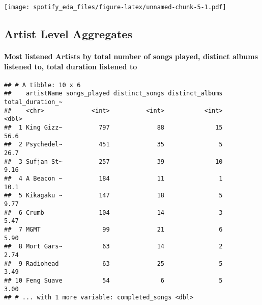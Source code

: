 \documentclass[]{article}
\newenvironment{Shaded}{\begin{snugshade}}{\end{snugshade}}
\newcommand{\DataTypeTok}[1]{\textcolor[rgb]{0.13,0.29,0.53}{#1}}
\newcommand{\DecValTok}[1]{\textcolor[rgb]{0.00,0.00,0.81}{#1}}
\newcommand{\KeywordTok}[1]{\textcolor[rgb]{0.13,0.29,0.53}{\textbf{#1}}}
\newcommand{\NormalTok}[1]{#1}
\newcommand{\OperatorTok}[1]{\textcolor[rgb]{0.81,0.36,0.00}{\textbf{#1}}}
\newcommand{\StringTok}[1]{\textcolor[rgb]{0.31,0.60,0.02}{#1}}
\let\oldparagraph\paragraph
\renewcommand{\paragraph}[1]{\oldparagraph{#1}\mbox{}}
\begin{document}
\texttt{[image: spotify\_eda\_files/figure-latex/unnamed-chunk-5-1.pdf]}

\hypertarget{artist-level-aggregates}{%
\subsection{Artist Level Aggregates}\label{artist-level-aggregates}}

\hypertarget{most-listened-artists-by-total-number-of-songs-played-distinct-albums-listened-to-total-duration-listened-to}{%
\paragraph{Most listened Artists by total number of songs played,
distinct albums listened to, total duration listened
to}\label{most-listened-artists-by-total-number-of-songs-played-distinct-albums-listened-to-total-duration-listened-to}}

\begin{Shaded}
\end{Shaded}

\begin{verbatim}
## # A tibble: 10 x 6
##    artistName songs_played distinct_songs distinct_albums total_duration_~
##    <chr>             <int>          <int>           <int>            <dbl>
##  1 King Gizz~          797             88              15            56.6 
##  2 Psychedel~          451             35               5            26.7 
##  3 Sufjan St~          257             39              10             9.16
##  4 A Beacon ~          184             11               1            10.1 
##  5 Kikagaku ~          147             18               5             9.77
##  6 Crumb               104             14               3             5.47
##  7 MGMT                 99             21               6             5.90
##  8 Mort Gars~           63             14               2             2.74
##  9 Radiohead            63             25               5             3.49
## 10 Feng Suave           54              6               5             3.00
## # ... with 1 more variable: completed_songs <dbl>
\end{verbatim}
\end{document}
